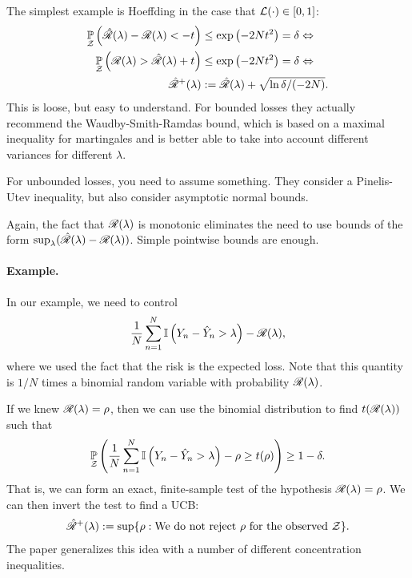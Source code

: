 \documentclass[twoside,11pt]{article}
\numberwithin{equation}{section}
\begin{document}
The simplest example is Hoeffding in the case that $\mathcal{L}(\cdot) \in [0,1]$:
%
\begin{align*}
%
\p{\calset}{\riskhat(\lambda) - \risk(\lambda) < -t} &\le
\exp\left(-2\n t^2 \right) = \delta \Leftrightarrow \\
\p{\calset}{\risk(\lambda) > \riskhat(\lambda) + t} &\le
\exp\left(-2\n t^2 \right) = \delta \Leftrightarrow \\
\rupper(\lambda) &:= \riskhat(\lambda) + \sqrt{\ln \delta / (-2 \n)}.
%
\end{align*}
%
This is loose, but easy to understand.  For bounded losses they actually
recommend the Waudby-Smith-Ramdas bound, which is based on a maximal inequality
for martingales and is better able to take into account different
variances for different $\lambda$.

For unbounded losses, you need to assume something.  They consider
a Pinelis-Utev inequality, but also consider asymptotic normal bounds.

Again, the fact that $\mathscr{R}(\lambda)$ is monotonic eliminates the need
to use bounds of the form $\sup_{\lambda} (\hat{\mathscr{R}}(\lambda) - \mathscr{R}(\lambda))$.
Simple pointwise bounds are enough.


\paragraph{Example. } In our example, we need to control
%
\begin{align*}
%
\meann \ind{\y_n - \yhat_n > \lambda} - \risk(\lambda),
%
\end{align*}
%
where we used the fact that the risk is the expected loss.  Note
that this quantity is $1/N$ times a binomial random variable
with probability $\mathscr{R}(\lambda)$.

If we knew $\mathscr{R}(\lambda) = \rho$, then we can use the binomial
distribution to find $t(\mathscr{R}(\lambda))$ such that 
%
\begin{align*}
%
\p{\calset}{\meann \ind{\y_n - \yhat_n > \lambda} - \rho
    \ge t(\rho)} \ge 1 - \delta.
%
\end{align*}
%
That is, we can form an exact, finite-sample test of the hypothesis
$\mathscr{R}(\lambda) = \rho$.  We can then invert the test to find
a UCB:
%
\begin{align*}
%
\rupper(\lambda) := \sup \{\rho: 
    \textrm{We do not reject }\rho\textrm{ for the observed } \calset\}.
%
\end{align*}
%
The paper generalizes this idea with a number of different concentration
inequalities.
\end{document}
